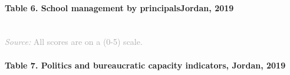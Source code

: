 \documentclass[twocolumn]{article}
\let\oldparagraph\paragraph
\renewcommand{\paragraph}[1]{\oldparagraph{#1}\mbox{}}
\begin{document}
\vfill\null

\hypertarget{table-6.-school-management-by-principalsjordan-2019}{%
\paragraph{Table 6. School management by principalsJordan,
2019}\label{table-6.-school-management-by-principalsjordan-2019}}

\begin{table}[H]
\\
{\scriptsize
    \textcolor{darkgray}{\textit{Source:} All scores are on a (0-5) scale.}
  }

\end{table}

\hypertarget{table-7.-politics-and-bureaucratic-capacity-indicators-jordan-2019}{%
\paragraph{Table 7. Politics and bureaucratic capacity indicators,
Jordan,
2019}\label{table-7.-politics-and-bureaucratic-capacity-indicators-jordan-2019}}
\end{document}
